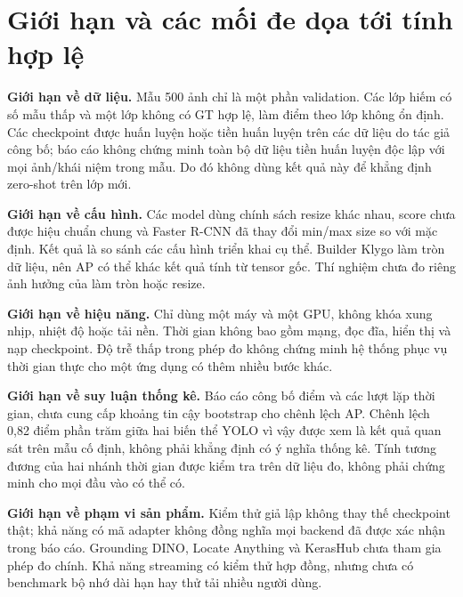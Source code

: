 \section{Giới hạn và các mối đe dọa tới tính hợp lệ}
\textbf{Giới hạn về dữ liệu.} Mẫu 500 ảnh chỉ là một phần validation. Các lớp hiếm có số mẫu thấp và một lớp không có GT hợp lệ, làm điểm theo lớp không ổn định. Các checkpoint được huấn luyện hoặc tiền huấn luyện trên các dữ liệu do tác giả công bố; báo cáo không chứng minh toàn bộ dữ liệu tiền huấn luyện độc lập với mọi ảnh/khái niệm trong mẫu. Do đó không dùng kết quả này để khẳng định zero-shot trên lớp mới.

\textbf{Giới hạn về cấu hình.} Các model dùng chính sách resize khác nhau, score chưa được hiệu chuẩn chung và Faster R-CNN đã thay đổi min/max size so với mặc định. Kết quả là so sánh các cấu hình triển khai cụ thể. Builder Klygo làm tròn dữ liệu, nên AP có thể khác kết quả tính từ tensor gốc. Thí nghiệm chưa đo riêng ảnh hưởng của làm tròn hoặc resize.

\textbf{Giới hạn về hiệu năng.} Chỉ dùng một máy và một GPU, không khóa xung nhịp, nhiệt độ hoặc tải nền. Thời gian không bao gồm mạng, đọc đĩa, hiển thị và nạp checkpoint. Độ trễ thấp trong phép đo không chứng minh hệ thống phục vụ thời gian thực cho một ứng dụng có thêm nhiều bước khác.

\textbf{Giới hạn về suy luận thống kê.} Báo cáo công bố điểm và các lượt lặp thời gian, chưa cung cấp khoảng tin cậy bootstrap cho chênh lệch AP. Chênh lệch 0,82 điểm phần trăm giữa hai biến thể YOLO vì vậy được xem là kết quả quan sát trên mẫu cố định, không phải khẳng định có ý nghĩa thống kê. Tính tương đương của hai nhánh thời gian được kiểm tra trên dữ liệu đo, không phải chứng minh cho mọi đầu vào có thể có.

\textbf{Giới hạn về phạm vi sản phẩm.} Kiểm thử giả lập không thay thế checkpoint thật; khả năng có mã adapter không đồng nghĩa mọi backend đã được xác nhận trong báo cáo. Grounding DINO, Locate Anything và KerasHub chưa tham gia phép đo chính. Khả năng streaming có kiểm thử hợp đồng, nhưng chưa có benchmark bộ nhớ dài hạn hay thử tải nhiều người dùng.


